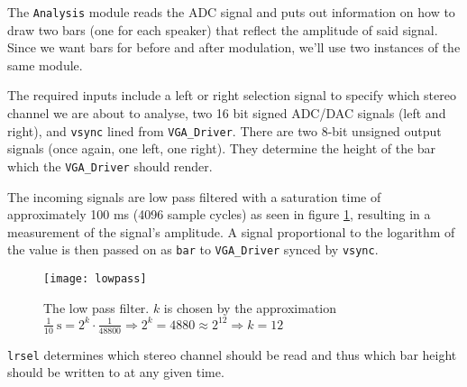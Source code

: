 The \verb=Analysis= module reads the ADC signal and puts out information on how to draw two bars (one for each speaker) that reflect the amplitude of said signal. Since we want bars for before and after modulation, we'll use two instances of the same module. 

The required inputs include a left or right selection signal to specify which stereo channel we are about to analyse, two 16 bit signed ADC/DAC signals (left and right), and \verb=vsync= lined from \verb+VGA_Driver+. There are two 8-bit unsigned output signals (once again, one left, one right). They determine the height of the bar which the \verb=VGA_Driver= should render.

The incoming signals are low pass filtered with a saturation time of approximately 100 ms (4096 sample cycles) as seen in figure \ref{fig:lowpass}, resulting in a measurement of the signal's amplitude. A signal proportional to the logarithm of the value is then passed on as \verb+bar+ to \verb+VGA_Driver+ synced by \verb+vsync+.

\begin{figure}[h]
\centering
\texttt{[image: lowpass]}
\caption{The low pass filter. $k$ is chosen by the approximation $\frac{1}{10}\mathrm{\ s} = 2^k\cdot\frac{1}{48800}\Rightarrow 2^k=4880\approx 2^{12}\Rightarrow k = 12 $}
\label{fig:lowpass}
\end{figure}


\verb=lrsel= determines which stereo channel should be read and thus which bar height should be written to at any given time.


